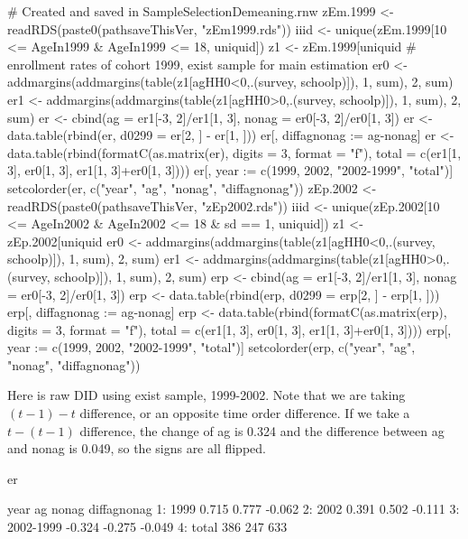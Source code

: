 \begin{Schunk}
\begin{Sinput}
# Created and saved in SampleSelectionDemeaning.rnw
zEm.1999 <- readRDS(paste0(pathsaveThisVer, "zEm1999.rds"))
iiid <- unique(zEm.1999[10 <= AgeIn1999 & AgeIn1999 <= 18, uniquid])
z1 <- zEm.1999[uniquid %in% iiid & survey != 2006 & sd == 1, ]
# enrollment rates of cohort 1999, exist sample for main estimation
er0 <- addmargins(addmargins(table(z1[agHH0<0,.(survey, schoolp)]), 1, sum), 2, sum)
er1 <- addmargins(addmargins(table(z1[agHH0>0,.(survey, schoolp)]), 1, sum), 2, sum)
er <- cbind(ag = er1[-3, 2]/er1[1, 3], nonag = er0[-3, 2]/er0[1, 3])
er <- data.table(rbind(er, d0299 = er[2, ] - er[1, ]))
er[, diffagnonag := ag-nonag]
er <- data.table(rbind(formatC(as.matrix(er), digits = 3, format = "f"), 
  total = c(er1[1, 3], er0[1, 3], er1[1, 3]+er0[1, 3])))
er[, year := c(1999, 2002, "2002-1999", "total")]
setcolorder(er, c("year", "ag", "nonag", "diffagnonag"))
zEp.2002 <- readRDS(paste0(pathsaveThisVer, "zEp2002.rds"))
iiid <- unique(zEp.2002[10 <= AgeIn2002 & AgeIn2002 <= 18 & sd == 1, uniquid])
z1 <- zEp.2002[uniquid %in% iiid & survey != 1999, ]
er0 <- addmargins(addmargins(table(z1[agHH0<0,.(survey, schoolp)]), 1, sum), 2, sum)
er1 <- addmargins(addmargins(table(z1[agHH0>0,.(survey, schoolp)]), 1, sum), 2, sum)
erp <- cbind(ag = er1[-3, 2]/er1[1, 3], nonag = er0[-3, 2]/er0[1, 3])
erp <- data.table(rbind(erp, d0299 = erp[2, ] - erp[1, ]))
erp[, diffagnonag := ag-nonag]
erp <- data.table(rbind(formatC(as.matrix(erp), digits = 3, format = "f"), 
  total = c(er1[1, 3], er0[1, 3], er1[1, 3]+er0[1, 3])))
erp[, year := c(1999, 2002, "2002-1999", "total")]
setcolorder(erp, c("year", "ag", "nonag", "diffagnonag"))
\end{Sinput}
\end{Schunk}
Here is raw DID using \textsf{exist} sample, 1999-2002. Note that we are taking $(t-1)-t$ difference, or an opposite time order difference. If we take a $t-(t-1)$ difference, the change of ag is 0.324 and the difference between ag and nonag is 0.049, so the signs are all flipped.
\begin{Schunk}
\begin{Sinput}
er
\end{Sinput}
\begin{Soutput}
        year     ag  nonag diffagnonag
1:      1999  0.715  0.777      -0.062
2:      2002  0.391  0.502      -0.111
3: 2002-1999 -0.324 -0.275      -0.049
4:     total    386    247         633
\end{Soutput}
\end{Schunk}
